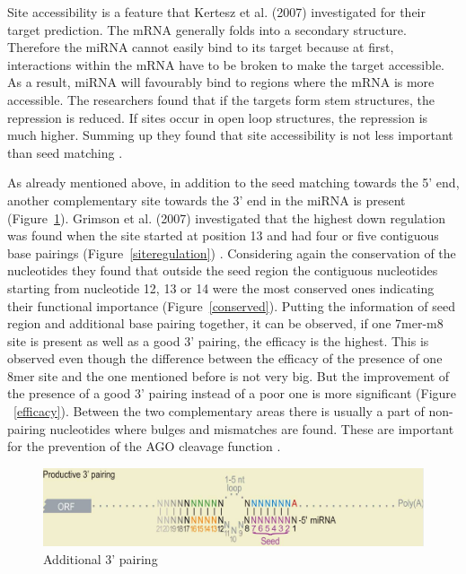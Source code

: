 \documentclass[12pt]{article}
\begin{document}
Site accessibility is a feature that Kertesz et al. (2007) investigated for their target prediction. The mRNA generally folds into a secondary structure. Therefore the miRNA cannot easily bind to its target because at first, interactions within the mRNA have to be broken to make the target accessible. As a result, miRNA will favourably bind to regions where the mRNA is more accessible. The researchers found that if the targets form stem structures, the repression is reduced. If sites occur in open loop structures, the repression is much higher. Summing up they found that site accessibility is not less important than seed matching \cite{Kertesz}. 

As already mentioned above, in addition to the seed matching towards the 5' end, another complementary site towards the 3' end in the miRNA is present (Figure~\ref{addipairing}). Grimson et al. (2007) investigated that the highest down regulation was found when the site started at position 13 and had four or five contiguous base pairings (Figure~\ref{siteregulation}) \cite{Grimson}. Considering again the conservation of the nucleotides they found that outside the seed region the contiguous nucleotides starting from nucleotide 12, 13 or 14 were the most conserved ones indicating their functional importance (Figure~\ref{conserved}). Putting the information of seed region and additional base pairing together, it can be observed, if one 7mer-m8 site is present as well as a good 3' pairing, the efficacy is the highest. This is observed even though the difference between the efficacy of the presence of one 8mer site and the one mentioned before is not very big. But the improvement of the presence of a good 3' pairing instead of a poor one is more significant (Figure ~\ref{efficacy}).
Between the two complementary areas there is usually a part of non-pairing nucleotides where bulges and mismatches are found. These are important for the prevention of the AGO cleavage function \cite{Filipowicz}.

\begin{figure}[h]
\centering
\includegraphics[scale=0.3]{results/additional_pairing.PNG}
\caption{Additional 3' pairing}
\label{addipairing}
\end{figure}
\end{document}
